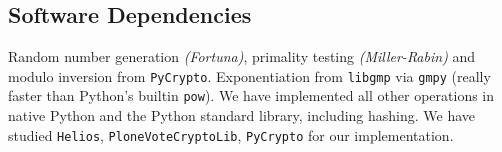 \documentclass[letterpaper,twocolumn,10pt]{article}
\begin{document}
\subsection{Software Dependencies}
Random number generation \emph{(Fortuna)}, primality testing
\emph{(Miller-Rabin)} and modulo inversion from \texttt{PyCrypto}.
Exponentiation from \texttt{libgmp} via \texttt{gmpy} (really faster
than Python's builtin \texttt{pow}). We have implemented all other
operations in native Python and the Python standard library, including
hashing. We have studied \texttt{Helios}, \texttt{PloneVoteCryptoLib},
\texttt{PyCrypto} for our implementation.

\end{document}
